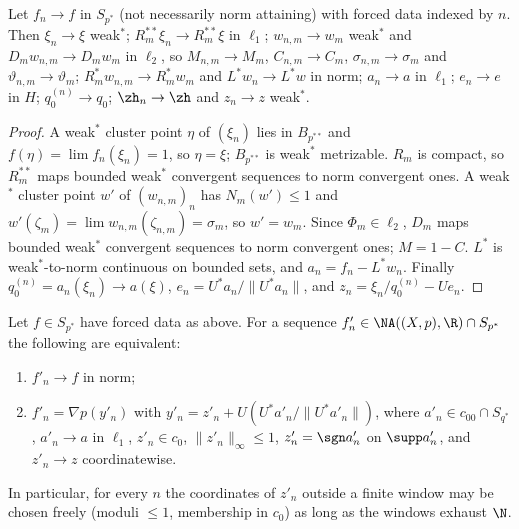 \begin{proposition}\label{prop:continuity}
Let $f_n\to f$ in $S_{p^*}$ \textup{(}not necessarily norm attaining\textup{)}
with forced data indexed by $n$.  Then $\xi_n\to\xi$ weak$^*$;
$R_m^{**}\xi_n\to R_m^{**}\xi$ in $\ell_1$; $w_{n,m}\to w_m$ weak$^*$ and
$D_mw_{n,m}\to D_mw_m$ in $\ell_2$, so $M_{n,m}\to M_m$, $C_{n,m}\to C_m$,
$\sigma_{n,m}\to\sigma_m$ and $\vartheta_{n,m}\to\vartheta_m$;
$R_m^*w_{n,m}\to R_m^*w_m$ and $L^*w_n\to L^*w$ in norm; $a_n\to a$ in
$\ell_1$; $e_n\to e$ in $H$; $q_0^{(n)}\to q_0$; $\zh_n\to\zh$ and
$z_n\to z$ weak$^*$.
\end{proposition}

\begin{proof}
A weak$^*$ cluster point $\eta$ of $(\xi_n)$ lies in $B_{p^{**}}$ and
$f(\eta)=\lim f_n(\xi_n)=1$, so $\eta=\xi$; $B_{p^{**}}$ is weak$^*$
metrizable.  $R_m$ is compact, so $R_m^{**}$ maps bounded weak$^*$
convergent sequences to norm convergent ones.  A weak$^*$ cluster point
$w'$ of $(w_{n,m})_n$ has $N_m(w')\le1$ and
$w'(\zeta_m)=\lim w_{n,m}(\zeta_{n,m})=\sigma_m$, so $w'=w_m$.  Since
$\Phi_m\in\ell_2$, $D_m$ maps bounded weak$^*$ convergent sequences to
norm convergent ones; $M=1-C$.  $L^*$ is weak$^*$-to-norm continuous on
bounded sets, and $a_n=f_n-L^*w_n$.  Finally
$q_0^{(n)}=a_n(\xi_n)\to a(\xi)$, $e_n=U^*a_n/\|U^*a_n\|$, and
$z_n=\xi_n/q_0^{(n)}-Ue_n$.
\end{proof}

\begin{proposition}\label{prop:approximants}
Let $f\in S_{p^*}$ have forced data as above.  For a sequence
$f'_n\in\NA((X,p),\R)\cap S_{p^*}$ the following are equivalent:
\begin{enumerate}
\item[(i)] $f'_n\to f$ in norm;
\item[(ii)] $f'_n=\nabla p(y'_n)$ with $y'_n=z'_n+U(U^*a'_n/\|U^*a'_n\|)$,
where $a'_n\in c_{00}\cap S_{q^*}$, $a'_n\to a$ in $\ell_1$, $z'_n\in c_0$,
$\|z'_n\|_\infty\le1$, $z'_n=\sgn a'_n$ on $\supp a'_n$, and $z'_n\to z$
coordinatewise.
\end{enumerate}
In particular, for every $n$ the coordinates of $z'_n$ outside a finite
window may be chosen freely \textup{(}moduli $\le1$, membership in
$c_0$\textup{)} as long as the windows exhaust $\N$.
\end{proposition}

